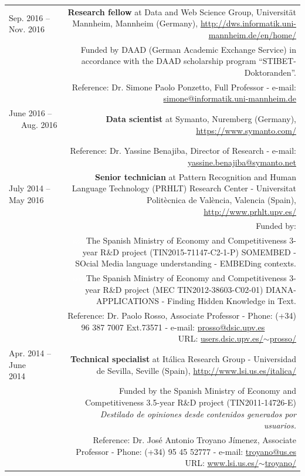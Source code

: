 \documentclass[10pt]{article}
\begin{document}
\begin{tabular}{L!{\VRule}R}
 Sep. 2016 -- Nov. 2016 ~~&{\textbf{Research fellow} at Data and Web Science Group, Universit{\"a}t Mannheim, Mannheim (Germany), \url{http://dws.informatik.uni-mannheim.de/en/home/}}\\
 &\scriptsize{Funded by DAAD (German Academic Exchange Service) in accordance with the DAAD scholarship program ``STIBET-Doktoranden''.}\\
 &\scriptsize{Reference: Dr. Simone Paolo Ponzetto, Full Professor - e-mail: \href{mailto:simone@informatik.uni-mannheim.de}{simone@informatik.uni-mannheim.de}}\\

June 2016 -- ~~~Aug. 2016 ~~&{\textbf{Data scientist} at Symanto, Nuremberg (Germany), \url{https://www.symanto.com/}}\\
&\scriptsize{Reference: Dr. Yassine Benajiba, Director of Research - e-mail: \href{mailto:yassine.benajiba@symanto.net}{yassine.benajiba@symanto.net}}\\

July 2014 -- May 2016 ~~&{\textbf{Senior technician} at Pattern Recognition and Human Language Technology (PRHLT) Research Center - Universitat Polit{\`e}cnica de Val{\`e}ncia, Valencia (Spain),
\url{http://www.prhlt.upv.es/}}\\
&\scriptsize{Funded by:}\\
&\scriptsize{\textcolor{white}{ssss}The Spanish Ministry of Economy and Competitiveness 3-year R\&D project (TIN2015-71147-C2-1-P) SOMEMBED - SOcial Media language 
understanding - EMBEDing contexts.}\\
&\scriptsize{\textcolor{white}{ssss}The Spanish Ministry of Economy and Competitiveness 3-year R\&D project (MEC TIN2012-38603-C02-01) DIANA-APPLICATIONS - Finding Hidden Knowledge 
in Text.}\\
&\scriptsize{Reference: Dr. Paolo Rosso, Associate Professor - Phone: (+34) 96 387 7007 Ext.73571 - e-mail: \href{mailto:prosso@dsic.upv.es}{prosso@dsic.upv.es} ~~~~~~~ URL: \href{http://users.dsic.upv.es/~prosso/}{users.dsic.upv.es/$\sim$prosso/}}\\

Apr. 2014 -- June 2014~~~~&{\textbf{Technical specialist} at It{\'a}lica Research Group - Universidad de Sevilla, Seville (Spain), 
\url{http://www.lsi.us.es/italica/}}\\
&\scriptsize{Funded by the Spanish Ministry of Economy and Competitiveness 3.5-year R\&D project (TIN2011-14726-E) \emph{Destilado de opiniones desde contenidos generados por 
usuarios.}}\\
&\scriptsize{Reference: Dr. Jos{\'e} Antonio Troyano J{\'i}menez, Associate Professor - Phone: (+34) 95 45 52777 - e-mail: \href{mailto:troyano@us.es}{troyano@us.es} ~~~~~~~ URL: \href{http://www.lsi.us.es/~troyano/}{www.lsi.us.es/$\sim$troyano/}}\\
 

\end{tabular}
\end{document}
